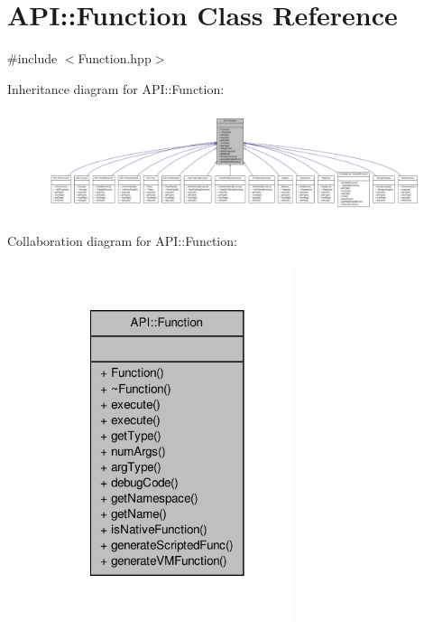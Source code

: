 \hypertarget{class_a_p_i_1_1_function}{\section{A\-P\-I\-:\-:Function Class Reference}
\label{class_a_p_i_1_1_function}
}


{\ttfamily \#include $<$Function.\-hpp$>$}



Inheritance diagram for A\-P\-I\-:\-:Function\-:
\nopagebreak
\begin{figure}[H]
\begin{center}
\leavevmode
\includegraphics[width=350pt]{class_a_p_i_1_1_function__inherit__graph}
\end{center}
\end{figure}


Collaboration diagram for A\-P\-I\-:\-:Function\-:
\nopagebreak
\begin{figure}[H]
\begin{center}
\leavevmode
\includegraphics[width=206pt]{class_a_p_i_1_1_function__coll__graph}
\end{center}
\end{figure}
